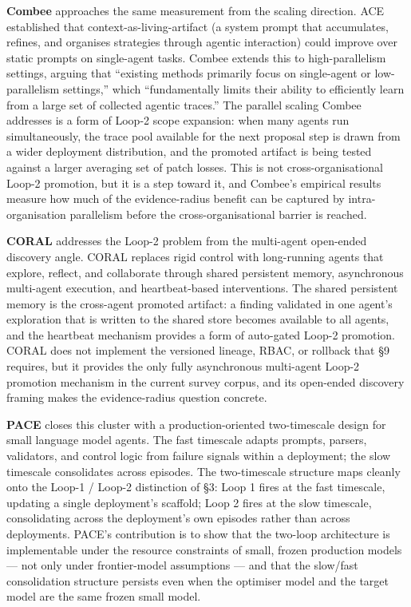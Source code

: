 \textbf{Combee} \citep{li2026combee} approaches the same measurement
from the scaling direction. ACE \citep{ace2025agentic} established that
context-as-living-artifact (a system prompt that accumulates, refines,
and organises strategies through agentic interaction) could improve over
static prompts on single-agent tasks. Combee extends this to
high-parallelism settings, arguing that ``existing methods primarily
focus on single-agent or low-parallelism settings,'' which
``fundamentally limits their ability to efficiently learn from a large
set of collected agentic traces.'' The parallel scaling Combee addresses
is a form of Loop-2 scope expansion: when many agents run
simultaneously, the trace pool available for the next proposal step is
drawn from a wider deployment distribution, and the promoted artifact is
being tested against a larger averaging set of patch losses. This is not
cross-organisational Loop-2 promotion, but it is a step toward it, and
Combee's empirical results measure how much of the evidence-radius
benefit can be captured by intra-organisation parallelism before the
cross-organisational barrier is reached.

\textbf{CORAL} \citep{qu2026coral} addresses the Loop-2 problem from the
multi-agent open-ended discovery angle. CORAL replaces rigid control
with long-running agents that explore, reflect, and collaborate through
shared persistent memory, asynchronous multi-agent execution, and
heartbeat-based interventions. The shared persistent memory is the
cross-agent promoted artifact: a finding validated in one agent's
exploration that is written to the shared store becomes available to all
agents, and the heartbeat mechanism provides a form of auto-gated Loop-2
promotion. CORAL does not implement the versioned lineage, RBAC, or
rollback that §9 requires, but it provides the only fully asynchronous
multi-agent Loop-2 promotion mechanism in the current survey corpus, and
its open-ended discovery framing makes the evidence-radius question
concrete.

\textbf{PACE} \citep{ling2026pace} closes this cluster with a
production-oriented two-timescale design for small language model
agents. The fast timescale adapts prompts, parsers, validators, and
control logic from failure signals within a deployment; the slow
timescale consolidates across episodes. The two-timescale structure maps
cleanly onto the Loop-1 / Loop-2 distinction of §3: Loop 1 fires at the
fast timescale, updating a single deployment's scaffold; Loop 2 fires at
the slow timescale, consolidating across the deployment's own episodes
rather than across deployments. PACE's contribution is to show that the
two-loop architecture is implementable under the resource constraints of
small, frozen production models --- not only under frontier-model
assumptions --- and that the slow/fast consolidation structure persists
even when the optimiser model and the target model are the same frozen
small model.

